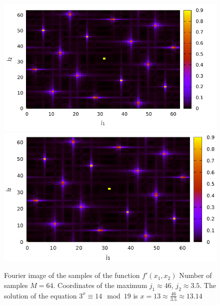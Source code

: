 \begin{figure}
\centering

\ifpdf
\includegraphics[angle=0]
{./part4/quantcomp/picdiscretlog3.pdf}
\else
\includegraphics[angle=0]
{./part4/quantcomp/picdiscretlog3.eps}
\fi

%

\caption{Fourier image of the samples of the function 
$f'(x_1, x_2)$
Number of samples $M=64$. Coordinates of the maximum $j_1 \approx 46$, $j_2 \approx 3.5$. 
The solution of the equation $3^x \equiv 14 \mod 19$
is $x = 13 \approx \frac{46}{3.5} \approx 13.14$
} 
\label{fig:part4:quantcomp:dl3}
\end{figure}